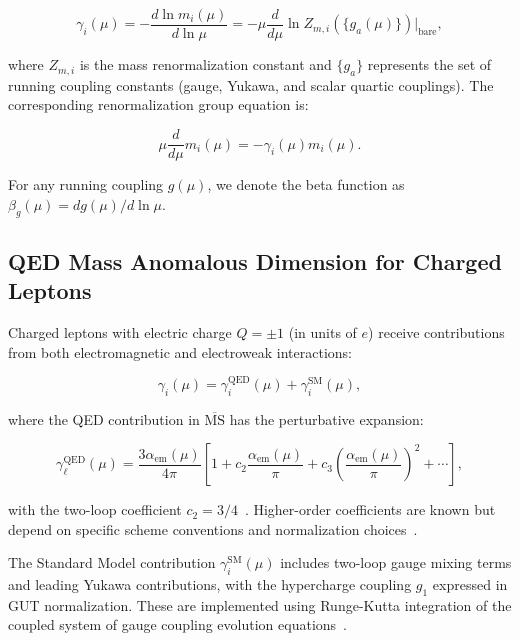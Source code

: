 \documentclass[%
amsmath,amssymb,
aps,
prb,
floatfix,
twocolumn
]{revtex4-2}
\begin{document}
\begin{equation}
\gamma_i(\mu) = -\frac{d\ln m_i(\mu)}{d\ln\mu} = -\mu \frac{d}{d\mu}\ln Z_{m,i}(\{g_a(\mu)\})\Big|_{\text{bare}},
\label{eq:gamma_definition}
\end{equation}

where $Z_{m,i}$ is the mass renormalization constant and $\{g_a\}$ represents the set of running coupling constants (gauge, Yukawa, and scalar quartic couplings). The corresponding renormalization group equation is:

\begin{equation}
\mu \frac{d}{d\mu} m_i(\mu) = -\gamma_i(\mu) m_i(\mu).
\label{eq:mass_rge}
\end{equation}

For any running coupling $g(\mu)$, we denote the beta function as $\beta_g(\mu) = dg(\mu)/d\ln\mu$.

\subsection{QED Mass Anomalous Dimension for Charged Leptons}
\label{subsec:qed_anomalous}

Charged leptons with electric charge $Q = \pm 1$ (in units of $e$) receive contributions from both electromagnetic and electroweak interactions:

\begin{equation}
\gamma_i(\mu) = \gamma_i^{\text{QED}}(\mu) + \gamma_i^{\text{SM}}(\mu),
\label{eq:lepton_gamma_split}
\end{equation}

where the QED contribution in $\overline{\text{MS}}$ has the perturbative expansion:

\begin{equation}
\gamma_\ell^{\text{QED}}(\mu) = \frac{3\alpha_{\text{em}}(\mu)}{4\pi}\left[1 + c_2 \frac{\alpha_{\text{em}}(\mu)}{\pi} + c_3 \left(\frac{\alpha_{\text{em}}(\mu)}{\pi}\right)^2 + \cdots\right],
\label{eq:qed_gamma_expansion}
\end{equation}

with the two-loop coefficient $c_2 = 3/4$~\cite{Tarrach1981}. Higher-order coefficients are known but depend on specific scheme conventions and normalization choices~\cite{ChetyrkinKuehnSteinhauser2000,HerrenSteinhauser2018}.

The Standard Model contribution $\gamma_i^{\text{SM}}(\mu)$ includes two-loop gauge mixing terms and leading Yukawa contributions, with the hypercharge coupling $g_1$ expressed in GUT normalization. These are implemented using Runge-Kutta integration of the coupled system of gauge coupling evolution equations~\cite{MachacekVaughn1983-85,Buttazzo2013}.
\end{document}
